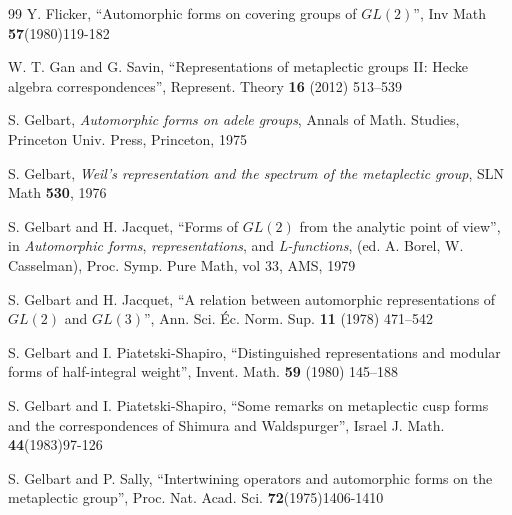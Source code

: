 \documentclass[12pt,letterpaper,openany]{book}
\theoremstyle{plain}
\theoremstyle{definition}
\theoremstyle{remark}
\theoremstyle{remark}
\begin{document}
\begin{thebibliography}{99}
 Y. Flicker, ``Automorphic forms on covering groups of
$GL(2)$'', Inv
Math \textbf{57}(1980)119-182


 W. T. Gan and G. Savin, ``Representations of metaplectic
groups II: Hecke algebra correspondences'', Represent. Theory
\textbf{16} (2012) 513--539

 S. Gelbart, \emph{Automorphic forms on adele groups},
Annals of
Math. Studies, Princeton Univ. Press, Princeton, 1975

 S. Gelbart, \emph{Weil's representation and the
spectrum of the metaplectic} \emph{group},
SLN Math \textbf{530}, 1976

 S. Gelbart and H. Jacquet,
``Forms of $GL(2)$ from the analytic
point of view'', in \emph{Automorphic forms},
\emph{representations}, and \emph{L-functions},
(ed. A. Borel, W. Casselman), Proc. Symp. Pure Math, vol 33, AMS, 1979


 S. Gelbart and H. Jacquet, ``A relation between
automorphic representations of $GL(2)$ and $GL(3)$'', Ann. Sci. \'Ec.
Norm. Sup. \textbf{11} (1978) 471--542

 S. Gelbart and I. Piatetski-Shapiro, ``Distinguished
representations and modular forms of half-integral weight'', Invent.
Math. \textbf{59} (1980) 145--188

 S. Gelbart and I. Piatetski-Shapiro, ``Some remarks
on metaplectic cusp
forms and the correspondences of Shimura and Waldspurger'', Israel
J. Math.
\textbf{44}(1983)97-126

 S. Gelbart and P. Sally, ``Intertwining operators and
automorphic forms on the metaplectic group'', Proc. Nat. Acad. Sci.
\textbf{72}(1975)1406-1410




\end{thebibliography}
\end{document}
